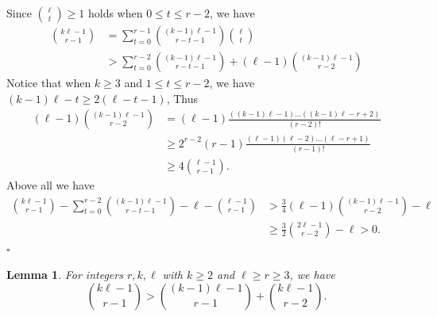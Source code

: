 \documentclass[12pt]{article}%
\newtheorem{lemma}[theorem]{Lemma}
\newenvironment{proof}{{\noindent\it Proof.}}{\hfill $\square$\par}
\begin{document}
 \begin{proof}
     Since $\binom{\ell}{t}\geq 1$ holds when $0\leq t\leq r-2$, we have
     \begin{equation*}
         \begin{aligned}
             \binom{k\ell-1}{r-1}&= \sum_{t=0}^{r-1}\binom{(k-1)\ell-1}{r-t-1}\binom{\ell}{t}\\
             &> \sum_{t=0}^{r-2}\binom{(k-1)\ell-1}{r-t-1}+(\ell-1)\binom{(k-1)\ell-1}{r-2}
         \end{aligned}
     \end{equation*}
     Notice that when $k\geq 3$ and $1\leq t\leq r-2$, we have $(k-1)\ell-t\geq 2(\ell-t-1)$,
     Thus
     \begin{equation*}
     \begin{aligned}
     (\ell-1)\binom{(k-1)\ell-1}{r-2}&= (\ell-1)\frac{\left((k-1)\ell-1\right)\ldots\left((k-1)\ell-r+2\right)}{(r-2)!}\\ &\geq 2^{r-2}(r-1)\frac{(\ell-1)(\ell-2)\ldots(\ell-r+1)}{(r-1)!}\\
     &\geq 4\binom{\ell-1}{r-1}.
     \end{aligned}
     \end{equation*}
     Above all we have
     \begin{equation*}
         \begin{aligned}
             \binom{k\ell-1}{r-1}-\sum_{t=0}^{r-2}\binom{(k-1)\ell-1}{r-t-1}-\ell-\binom{\ell-1}{r-1}&>\frac{3}{4}(\ell-1)\binom{(k-1)\ell-1}{r-2}-\ell\\
             &\geq \frac{3}{2}\binom{2\ell-1}{r-2}-\ell>0.
         \end{aligned}
     \end{equation*}
 \end{proof}
 \fi
 \begin{lemma}\label{lem: the ineuqlaity in sec 3 (3)}
 For integers $r,k,\ell$ with $k\geq 2$ and $\ell\geq r\geq 3$, we have
 $$\binom{k\ell-1}{r-1}>\binom{(k-1)\ell-1}{r-1}+\binom{k\ell-1}{r-2}.$$
  \end{lemma}
\end{document}

